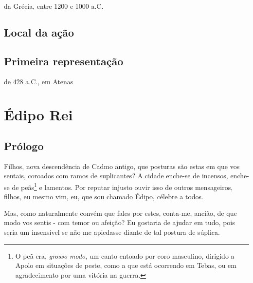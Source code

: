  da Grécia, entre 1200 e 1000 a.C.

\section{Local da ação} 


\section{Primeira representação} 

 de 428 a.C., em Atenas
\endgroup





\chapter*{Édipo Rei}

\begingroup





\section{Prólogo}

\bigskip

   Filhos, nova descendência de Cadmo antigo, que posturas são estas em que
vos sentais, coroados com ramos de suplicantes? A cidade enche-se de
incensos, enche-se de peãs\footnote{O peã era, \emph{grosso modo}, um 
canto entoado por coro masculino, dirigido a Apolo em situações de 
peste, como a que está ocorrendo em Tebas, ou em agradecimento por uma 
vitória na guerra.} e lamentos. Por reputar injusto ouvir isso de 
outros mensageiros, filhos, eu mesmo vim, eu, que sou chamado Édipo, 
célebre a todos.

Mas, como naturalmente convém que fales por estes, conta-me, ancião, de
que modo vos sentis - com temor ou afeição? Eu gostaria de ajudar
em tudo, pois seria um insensível se não me apiedasse diante de tal
postura de súplica.

